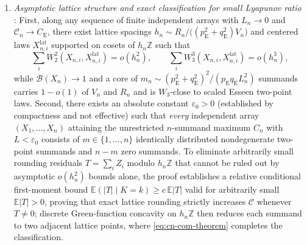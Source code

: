 \documentclass[11pt]{article}
\numberwithin{equation}{section}
\theoremstyle{definition}
\theoremstyle{remark}
\newcommand{\E}{\mathbb E}
\newcommand{\Z}{\mathbb Z}
\newcommand{\ce}{C_{\mathrm E}}
\newcommand{\pe}{p_{\mathrm E}}
\newcommand{\qe}{q_{\mathrm E}}
\newcommand{\eps}{\varepsilon}
\begin{document}
\begin{enumerate}[label=(\arabic*),leftmargin=2em]
\item \emph{Asymptotic lattice structure and exact classification for
small Lyapunov ratio} \citep[Theorems~1.1 and~1.2]{BellSmallStructure2026}:
First, along any sequence of finite independent arrays with $L_n\to0$ and
$\mathcal C_n\to\ce$, there exist lattice spacings
$h_n\sim R_n/\bigl((\pe^2+\qe^2)V_n\bigr)$ and centered laws $X_{n,i}^{\mathrm{lat}}$
supported on cosets of $h_n\Z$ such that
\[
 \sum_i W_2^2(X_{n,i},X_{n,i}^{\mathrm{lat}})=o(h_n^2),\qquad
 \sum_i W_3^3(X_{n,i},X_{n,i}^{\mathrm{lat}})=o(h_n^3),
\]
while $\mathcal B(X_n)\to1$ and a core of
$m_n\sim(\pe^2+\qe^2)^2/(\pe\qe L_n^2)$ summands carries $1-o(1)$ of $V_n$ and
$R_n$ and is $W_3$-close to scaled Esseen two-point laws. Second, there exists
an absolute constant $\eps_0>0$
(established by compactness and not effective) such that \emph{every}
independent array $(X_1,\ldots,X_n)$ attaining the unrestricted $n$-summand
maximum $C_n$ with $L<\eps_0$ consists of $m\in\{1,\ldots,n\}$ identically
distributed nondegenerate two-point summands and $n-m$ zero summands. To
eliminate arbitrarily small rounding residuals $T=\sum_i Z_i$ modulo $h_n\Z$
that cannot be ruled out by asymptotic $o(h_n^2)$ bounds alone, the proof
establishes a relative conditional first-moment bound
$\E(|T|\mid K=k)\ge c\,\E|T|$ valid for arbitrarily small $\E|T|>0$, proving
that exact lattice rounding strictly increases $\mathcal C$ whenever $T\ne0$;
discrete Green-function concavity on $h_n\Z$ then reduces each summand to two
adjacent lattice points, where \eqref{eq:cn-com-theorem} completes the
classification.


\end{enumerate}
\end{document}
